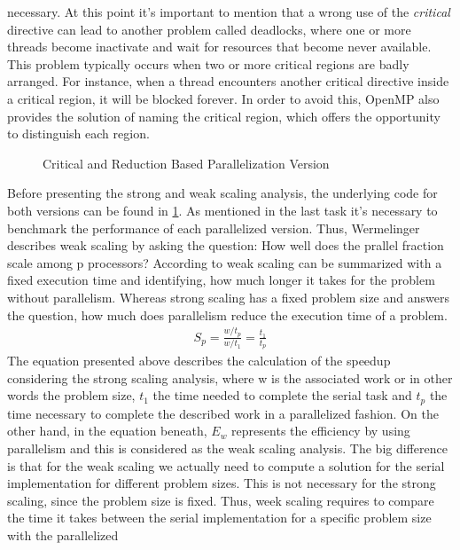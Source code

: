 \documentclass[unicode,11pt,a4paper,oneside,numbers=endperiod,openany]{scrartcl}
\begin{document}
necessary. At this point it's important to mention that a wrong use of the \textit{critical} directive can lead to another 
problem called deadlocks, where one or more threads become inactivate and wait for resources that become never available. 
This problem typically occurs when two or more critical regions are badly arranged. For instance, when a thread encounters 
another critical directive inside a critical region, it will be blocked forever. In order to avoid this, OpenMP also provides 
the solution of naming the critical region, which offers the opportunity to distinguish each region. \cite{HPC}
\begin{figure}[H]
  \centering
  {\fontsize{8}{10}\selectfont
  }
  \caption{Critical and Reduction Based Parallelization Version}
  \label{fig:critical_reduction}
\end{figure}
\indent
Before presenting the strong and weak scaling analysis, the underlying code for both versions can be found in 
\ref{fig:critical_reduction}. As mentioned in the last task it's necessary to benchmark the performance of each parallelized 
version. Thus, Wermelinger \cite{scaling} describes weak scaling by asking the question: How well does the prallel fraction scale 
among p processors? According to \cite{scaling} weak scaling can be summarized with a fixed execution time and identifying, 
how much longer it takes for the problem without parallelism. Whereas strong scaling has a fixed problem size and answers the question, 
how much does parallelism reduce the execution time of a problem.
\begin{align*}
  S_{p} = \frac{w/t_p}{w/t_1} = \frac{t_1}{t_p}
\end{align*}
\indent
The equation presented above describes the calculation of the speedup considering the strong scaling analysis, where w is the associated 
work or in other words the problem size, $t_1$ the time needed to complete the serial task and $t_p$ the time necessary to complete the 
described work in a parallelized fashion. On the other hand, in the equation beneath, $E_w$ represents the efficiency by using parallelism 
and this is considered as the weak scaling analysis. The big difference is that for the weak scaling we actually need to compute a solution 
for the serial implementation for different problem sizes. This is not necessary for the strong scaling, since the problem size is fixed. 
Thus, week scaling requires to compare the time it takes between the serial implementation for a specific problem size with the parallelized 
\end{document}
